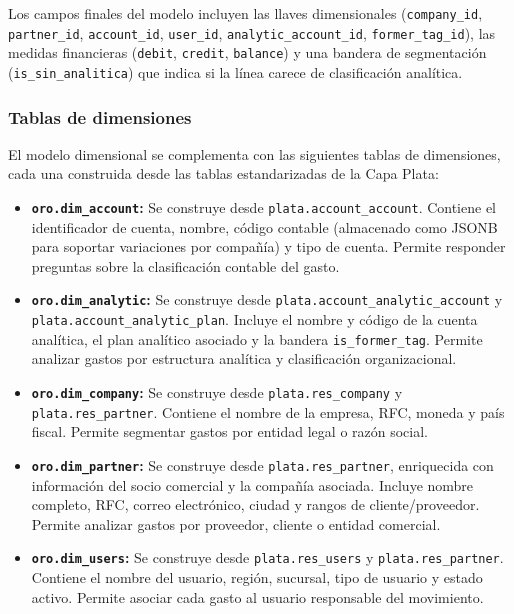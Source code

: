 Los campos finales del modelo incluyen las llaves dimensionales (\texttt{company\_id}, \texttt{partner\_id}, \texttt{account\_id}, \texttt{user\_id}, \texttt{analytic\_account\_id}, \texttt{former\_tag\_id}), las medidas financieras (\texttt{debit}, \texttt{credit}, \texttt{balance}) y una bandera de segmentación (\texttt{is\_sin\_analitica}) que indica si la línea carece de clasificación analítica.

\subsubsection{Tablas de dimensiones}

El modelo dimensional se complementa con las siguientes tablas de dimensiones, cada una construida desde las tablas estandarizadas de la Capa Plata:

\begin{itemize}
    \item \textbf{\texttt{oro.dim\_account}:} Se construye desde \texttt{plata.account\_account}. Contiene el identificador de cuenta, nombre, código contable (almacenado como JSONB para soportar variaciones por compañía) y tipo de cuenta. Permite responder preguntas sobre la clasificación contable del gasto.

    \item \textbf{\texttt{oro.dim\_analytic}:} Se construye desde \texttt{plata.account\_analytic\_account} y \texttt{plata.account\_analytic\_plan}. Incluye el nombre y código de la cuenta analítica, el plan analítico asociado y la bandera \texttt{is\_former\_tag}. Permite analizar gastos por estructura analítica y clasificación organizacional.

    \item \textbf{\texttt{oro.dim\_company}:} Se construye desde \texttt{plata.res\_company} y \texttt{plata.res\_partner}. Contiene el nombre de la empresa, RFC, moneda y país fiscal. Permite segmentar gastos por entidad legal o razón social.

    \item \textbf{\texttt{oro.dim\_partner}:} Se construye desde \texttt{plata.res\_partner}, enriquecida con información del socio comercial y la compañía asociada. Incluye nombre completo, RFC, correo electrónico, ciudad y rangos de cliente/proveedor. Permite analizar gastos por proveedor, cliente o entidad comercial.

    \item \textbf{\texttt{oro.dim\_users}:} Se construye desde \texttt{plata.res\_users} y \texttt{plata.res\_partner}. Contiene el nombre del usuario, región, sucursal, tipo de usuario y estado activo. Permite asociar cada gasto al usuario responsable del movimiento.
\end{itemize}

